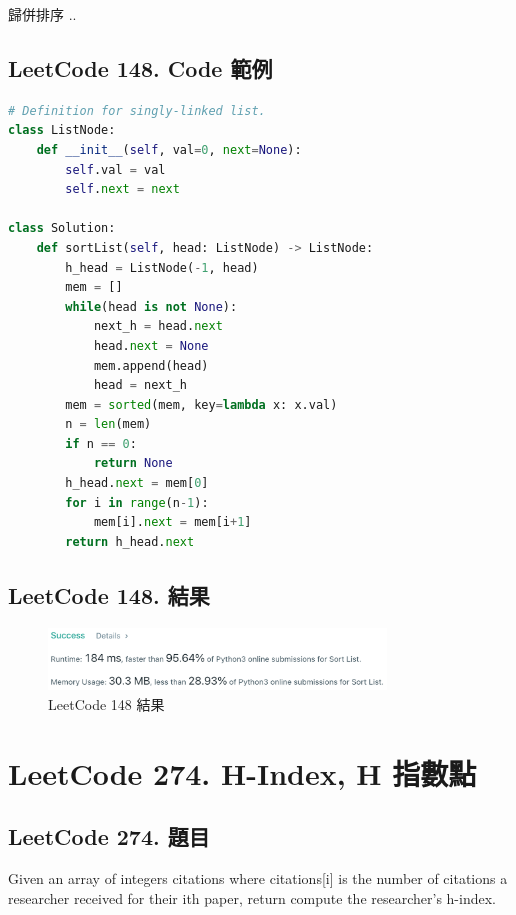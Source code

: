 \documentclass[10pt,UTF8]{ctexart}
\begin{document}
歸併排序 ..

\subsection{LeetCode 148. Code 範例}

\begin{lstlisting}[language={python}]
# Definition for singly-linked list.
class ListNode:
    def __init__(self, val=0, next=None):
        self.val = val
        self.next = next

class Solution:
    def sortList(self, head: ListNode) -> ListNode:
        h_head = ListNode(-1, head)
        mem = []
        while(head is not None):
            next_h = head.next
            head.next = None
            mem.append(head)
            head = next_h
        mem = sorted(mem, key=lambda x: x.val)
        n = len(mem)
        if n == 0:
            return None
        h_head.next = mem[0]
        for i in range(n-1):
            mem[i].next = mem[i+1]     
        return h_head.next
\end{lstlisting}

\subsection{LeetCode 148. 結果}

\begin{figure}[H]
\centering 
\includegraphics[width=0.80\textwidth]{lc-148-o.png} 
\caption{LeetCode 148 結果}
\label{Test}
\end{figure}


\newpage

\section{LeetCode 274. H-Index, H 指數點}

\subsection{LeetCode 274. 題目}

Given an array of integers citations where citations[i] is the number of citations a researcher received for their ith paper, return compute the researcher's h-index.
\end{document}
